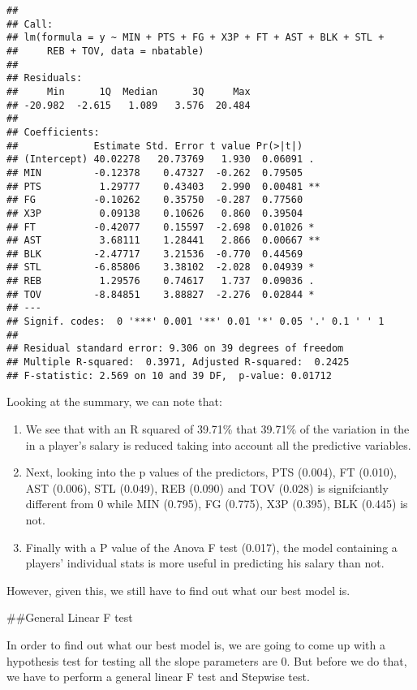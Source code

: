 \documentclass[
]{article}
\begin{document}
\begin{verbatim}
## 
## Call:
## lm(formula = y ~ MIN + PTS + FG + X3P + FT + AST + BLK + STL + 
##     REB + TOV, data = nbatable)
## 
## Residuals:
##     Min      1Q  Median      3Q     Max 
## -20.982  -2.615   1.089   3.576  20.484 
## 
## Coefficients:
##             Estimate Std. Error t value Pr(>|t|)   
## (Intercept) 40.02278   20.73769   1.930  0.06091 . 
## MIN         -0.12378    0.47327  -0.262  0.79505   
## PTS          1.29777    0.43403   2.990  0.00481 **
## FG          -0.10262    0.35750  -0.287  0.77560   
## X3P          0.09138    0.10626   0.860  0.39504   
## FT          -0.42077    0.15597  -2.698  0.01026 * 
## AST          3.68111    1.28441   2.866  0.00667 **
## BLK         -2.47717    3.21536  -0.770  0.44569   
## STL         -6.85806    3.38102  -2.028  0.04939 * 
## REB          1.29576    0.74617   1.737  0.09036 . 
## TOV         -8.84851    3.88827  -2.276  0.02844 * 
## ---
## Signif. codes:  0 '***' 0.001 '**' 0.01 '*' 0.05 '.' 0.1 ' ' 1
## 
## Residual standard error: 9.306 on 39 degrees of freedom
## Multiple R-squared:  0.3971, Adjusted R-squared:  0.2425 
## F-statistic: 2.569 on 10 and 39 DF,  p-value: 0.01712
\end{verbatim}

Looking at the summary, we can note that:

\begin{enumerate}
\def\labelenumi{\arabic{enumi})}
\item
  We see that with an R squared of 39.71\% that 39.71\% of the variation
  in the in a player's salary is reduced taking into account all the
  predictive variables.
\item
  Next, looking into the p values of the predictors, PTS (0.004), FT
  (0.010), AST (0.006), STL (0.049), REB (0.090) and TOV (0.028) is
  signifciantly different from 0 while MIN (0.795), FG (0.775), X3P
  (0.395), BLK (0.445) is not.
\item
  Finally with a P value of the Anova F test (0.017), the model
  containing a players' individual stats is more useful in predicting
  his salary than not.
\end{enumerate}

However, given this, we still have to find out what our best model is.

\#\#General Linear F test

In order to find out what our best model is, we are going to come up
with a hypothesis test for testing all the slope parameters are 0. But
before we do that, we have to perform a general linear F test and
Stepwise test.
\end{document}
